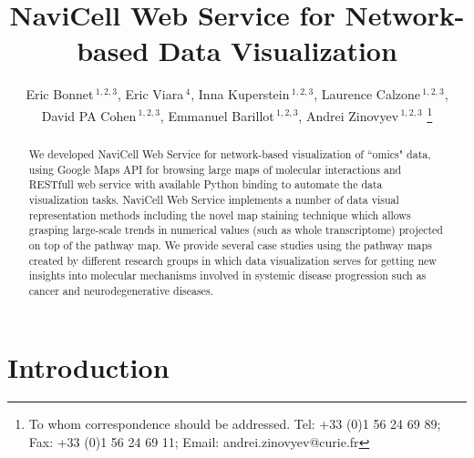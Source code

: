 \documentclass[a4,center,fleqn]{NAR}
\begin{document}
\title{NaviCell Web Service for Network-based Data Visualization}


\author{%
Eric Bonnet\,$^{1,2,3}$,
Eric Viara\,$^{4}$,
Inna Kuperstein\,$^{1,2,3}$,
Laurence Calzone\,$^{1,2,3}$,
David PA Cohen\,$^{1,2,3}$,
Emmanuel Barillot\,$^{1,2,3}$,
Andrei Zinovyev\,$^{1,2,3}$%
\footnote{To whom correspondence should be addressed.
Tel: +33 (0)1 56 24 69 89; Fax: +33 (0)1 56 24 69 11; Email: andrei.zinovyev@curie.fr}}

\address{%
$^{1}$Institut Curie, 26 rue d'Ulm, 75248 Paris, France,
$^{2}$INSERM U900, 75248 Paris, France,
$^{3}$Mines ParisTech, 77300 Fontainebleau, France,
$^{4}$Sysra, 91330 Yerres, France.
}




\maketitle

\begin{abstract}
We developed NaviCell Web Service for network-based visualization of ``omics" data, using Google Maps API
for browsing large maps of molecular interactions and RESTfull web service with available Python binding
to automate the data visualization tasks. NaviCell Web Service implements a number of data visual representation
methods including the novel map staining technique which allows grasping large-scale trends in
numerical values (such as whole transcriptome) projected on top of the pathway map. We provide several
case studies using the pathway maps created by different research groups in which data visualization
serves for getting new insights into molecular mechanisms involved in systemic disease progression such as cancer
and neurodegenerative diseases.

\end{abstract}


\section{Introduction}
\end{document}
